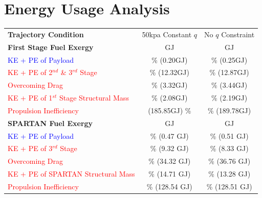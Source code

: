 \section{Energy Usage Analysis}\label{sec:exergy1}


\begin{table}[ht]
	\centering
	\begin{tabular}{l c c} 
		\hline \textbf{Trajectory Condition}
		&50kpa Constant $q$
		&No $q$ Constraint
		\\
		\textbf{First Stage Fuel Exergy} 
		&\textbf{\firstEnergyConstqNoReturn} GJ
		&\textbf{\firstEnergyStandardNoReturn} GJ
		\\
		
		\textcolor{blue}{KE + PE of Payload}
		& \firstWpayloadConstqNoReturn \% (0.20GJ)
		& \firstWpayloadStandardNoReturn \% (0.25GJ)
		\\
		\textcolor{red}{KE + PE of  2$^{nd}$ \& 3$^{rd}$ Stage}
		& \firstWnextStageConstqNoReturn \% (12.32GJ) & \firstWnextStageStandardNoReturn \% (12.87GJ)
		\\
		
		\textcolor{red}{Overcoming Drag} 
		& \WDoneConstqNoReturn \% (3.32GJ) & \WDoneStandardNoReturn \% (3.44GJ)
		\\
		\textcolor{red}{KE + PE of 1$^{st}$ Stage Structural Mass} 
		& \WoneConstqNoReturn \% (2.08GJ) & \WoneStandardNoReturn \% (2.19GJ)
		\\ 
		\textcolor{red}{Propulsion Inefficiency} 
		& \PlossoneCombinedConstqNoReturn (185.85GJ) \% & \PlossoneCombinedStandardNoReturn \% (189.78GJ)
		\\ 
		\textbf{SPARTAN Fuel Exergy} 
		& \textbf{\secondEnergyConstqNoReturn} GJ & \textbf{\secondEnergyStandardNoReturn} GJ
		\\
		\textcolor{blue}{KE + PE of Payload}
		& \secondWpayloadConstqNoReturn \% (0.47 GJ) & \secondWpayloadStandardNoReturn \% (0.51 GJ) 
		\\
		\textcolor{red}{KE + PE of 3$^{rd}$ Stage}
		& \secondWnextStageConstqNoReturn \% (9.32 GJ) & \secondWnextStageStandardNoReturn \% (8.33 GJ)
		\\
		\textcolor{red}{Overcoming Drag}
		& \WDsecondConstqNoReturn \% (34.32 GJ) & \WDsecondStandardNoReturn \% (36.76 GJ)
		\\
		\textcolor{red}{KE + PE of SPARTAN Structural Mass}  
		& \WsecondConstqNoReturn \% (14.71 GJ) & \WsecondStandardNoReturn \% (13.28 GJ)
		\\
		\textcolor{red}{Propulsion Inefficiency}  
		& \PlosssecondCombinedConstqNoReturn \% (128.54 GJ) & \PlosssecondCombinedStandardNoReturn \% (128.51 GJ)
		\\
		

\end{tabular}
\end{table}
